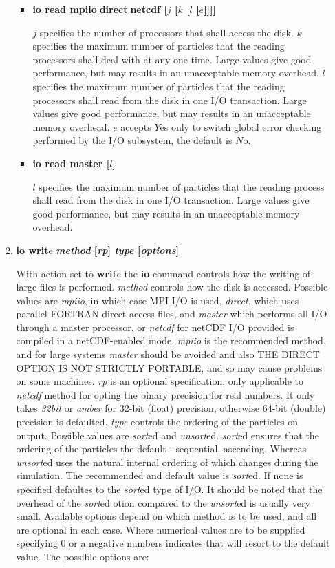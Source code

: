 \begin{enumerate}
\begin{enumerate}
\begin{itemize}
\item {\bf io read mpiio$|$direct$|$netcdf [$j$ [$k$ [$l$ [$e$]]]]}

$j$ specifies the number of processors that shall access
the disk.  $k$ specifies the maximum number of particles
that the reading processors shall deal with at any one time.
Large values give good performance, but may results in an
unacceptable memory overhead.  $l$ specifies the maximum
number of particles that the reading processors shall
read from the disk in one I/O transaction.  Large values
give good performance, but may results in an unacceptable
memory overhead.  $e$ accepts $Y$es only to switch global
error checking performed by the I/O subsystem, the default
is $N$o.

\item {\bf io read master [$l$]}

$l$ specifies the maximum number of particles that the
reading process shall read from the disk in one I/O
transaction.  Large values give good performance, but may
results in an unacceptable memory overhead.
\end{itemize}

\item {\bf io writ}e {\bf{\em method} [{\em rp}] {\em type} [{\em options}]}

With action set to {\bf writ}e the {\bf io} command
controls how the writing of large files is performed.
{\em method} controls how the disk is accessed.  Possible
values are {\em mpiio}, in which case MPI-I/O is used,
{\em direct}, which uses parallel FORTRAN direct access
files, and {\em master} which performs all I/O through
a master processor, or {\em netcdf} for netCDF I/O
provided \D is compiled in a netCDF-enabled mode.
{\em mpiio} is the recommended method, and for
large systems {\em master} should be avoided and also
THE DIRECT OPTION IS NOT STRICTLY PORTABLE, and so may
cause problems on some machines.  {\em rp} is an
optional specification, only applicable to {\em netcdf}
method for opting the binary precision for real numbers.
It only takes {\em 32bit} or {\em amber} for 32-bit
(float) precision, otherwise 64-bit (double) precision
is defaulted.  {\em type} controls the ordering of the
particles on output.  Possible values are {\em sort}ed
and {\em unsort}ed.  {\em sort}ed ensures that the
ordering of the particles the default - sequential,
ascending.  Whereas {\em unsort}ed uses the natural internal
ordering of \D which changes during the simulation.
The recommended and default value is {\em sort}ed.  If none
is specified \D defaultes to the {\em sort}ed type of I/O.
It should be noted that the overhead of the {\em sort}ed
otion compared to the {\em unsort}ed is usually very small.
Available options depend on which method is to be used, and
all are optional in each case.  Where numerical values are
to be supplied specifying 0 or a negative numbers
indicates that \D will resort to the default value.
The possible options are:


\end{enumerate}
\end{enumerate}
